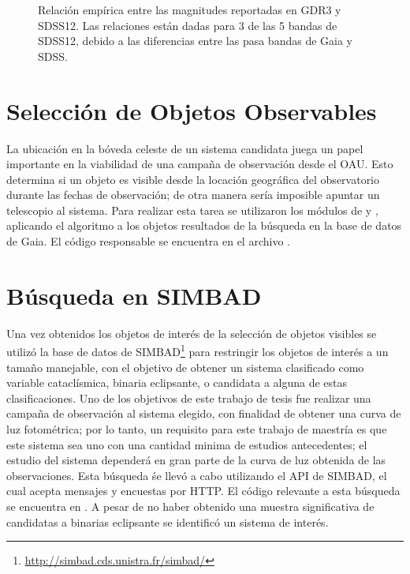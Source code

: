 \begin{figure}[!ht]
	\caption{Relación empírica entre las magnitudes reportadas en GDR3 y SDSS12. Las relaciones están dadas para 3 de las 5 bandas de SDSS12, debido a las diferencias entre las pasa bandas de Gaia y SDSS. }
	\label{gdr3SdssConversionGraphs}
\end{figure}

\section{Selección de Objetos Observables} \label{muestra:crit_seleccion:objetos_observables}

La ubicación en la bóveda celeste de un sistema candidata juega un papel
importante en la viabilidad de una campaña de observación desde el OAU. Esto
determina si un objeto es visible desde la locación geográfica del observatorio
durante las fechas de observación; de otra manera sería imposible apuntar un
telescopio al sistema. Para realizar esta tarea se utilizaron los módulos de
  y  , aplicando
el algoritmo a los objetos resultados de la búsqueda en la base de datos de
Gaia. El código responsable se encuentra en el archivo
\href{https://github.com/KnightIV/UANL_MAPTA_Observaciones/blob/main/obsrv_plan/gaia/observable_targets.py}{}.


\section{Búsqueda en SIMBAD} \label{muestra:crit_seleccion:busqueda_simbad}

Una vez obtenidos los objetos de interés de la selección de objetos visibles se
utilizó la base de datos de
SIMBAD\footnote{\url{http://simbad.cds.unistra.fr/simbad/}}
 para restringir los objetos de interés a un tamaño
manejable, con el objetivo de obtener un sistema clasificado como variable
cataclísmica, binaria eclipsante, o candidata a alguna de estas clasificaciones.
Uno de los objetivos de este trabajo de tesis fue realizar una campaña de
observación al sistema elegido, con finalidad de obtener una curva de luz
fotométrica; por lo tanto, un requisito para este trabajo de maestría es que
este sistema sea uno con una cantidad minima de estudios antecedentes; el
estudio del sistema dependerá en gran parte de la curva de luz obtenida de las
observaciones. Esta búsqueda śe llevó a cabo utilizando el API de SIMBAD, el
cual acepta mensajes y encuestas por HTTP. El código relevante a esta búsqueda
se encuentra en
\href{https://github.com/KnightIV/UANL_MAPTA_Observaciones/blob/main/obsrv_plan/simbad/retrieve_vots.py}{}.
A pesar de no haber obtenido una muestra significativa de candidatas a binarias
eclipsante se identificó un sistema de interés.

